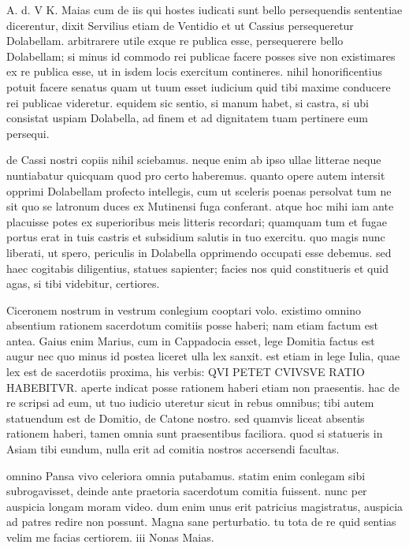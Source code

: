 


 A. d. V K. Maias cum de iis qui hostes iudicati sunt bello persequendis sententiae dicerentur, dixit Servilius etiam de Ventidio et ut Cassius persequeretur Dolabellam. arbitrarere utile exque re publica esse, persequerere bello Dolabellam; si minus id commodo rei publicae facere posses sive non existimares ex re publica esse, ut in isdem locis exercitum contineres. nihil honorificentius potuit facere senatus quam ut tuum esset iudicium quid tibi maxime conducere rei publicae videretur. equidem sic sentio, si manum habet, si castra, si ubi consistat uspiam Dolabella, ad finem et ad dignitatem tuam pertinere eum persequi.

 de Cassi nostri copiis nihil sciebamus. neque enim ab ipso ullae litterae neque nuntiabatur quicquam quod pro certo haberemus. quanto opere autem intersit opprimi Dolabellam profecto intellegis, cum ut sceleris poenas persolvat tum ne sit quo se latronum duces ex Mutinensi fuga conferant. atque hoc mihi iam ante placuisse potes ex superioribus meis litteris recordari; quamquam tum et fugae portus erat in tuis castris et subsidium salutis in tuo exercitu. quo magis nunc liberati, ut spero, periculis in Dolabella opprimendo occupati esse debemus. sed haec cogitabis diligentius, statues sapienter; facies nos quid constitueris et quid agas, si tibi videbitur, certiores.

 Ciceronem nostrum in vestrum conlegium cooptari volo. existimo omnino absentium rationem sacerdotum comitiis posse haberi; nam etiam factum est antea. Gaius enim Marius, cum in Cappadocia esset, lege Domitia factus est augur nec quo minus id postea liceret ulla lex sanxit. est etiam in lege Iulia, quae lex est de sacerdotiis proxima, his verbis: QVI PETET CVIVSVE RATIO HABEBITVR. aperte indicat posse rationem haberi etiam non praesentis. hac de re scripsi ad eum, ut tuo iudicio uteretur sicut in rebus omnibus; tibi autem statuendum est de Domitio, de Catone nostro. sed quamvis liceat absentis rationem haberi, tamen omnia sunt praesentibus faciliora. quod si statueris in Asiam tibi eundum, nulla erit ad comitia nostros accersendi facultas.

 omnino Pansa vivo celeriora omnia putabamus. statim enim conlegam sibi subrogavisset, deinde ante praetoria sacerdotum comitia fuissent. nunc per auspicia longam moram video. dum enim unus erit patricius magistratus, auspicia ad patres redire non possunt. Magna sane perturbatio. tu tota de re quid sentias velim me facias certiorem. iii Nonas Maias.
